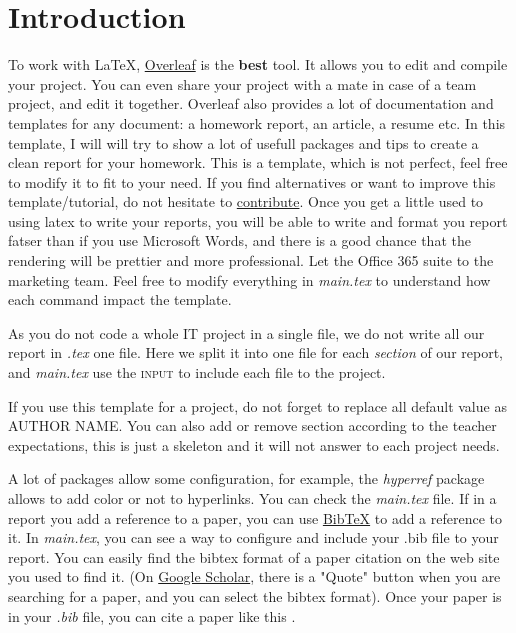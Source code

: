 \section{Introduction}\label{sec:intro}
To work with \LaTeX, \href{https://fr.overleaf.com/}{Overleaf} is the \textbf{best} tool. It allows you to edit and compile your project. You can even share your project with a mate in case of a team project, and edit it together. Overleaf also provides a lot of documentation and templates for any document: a homework report, an article, a resume etc.
In this template, I will will try to show  a lot of usefull packages and tips to create a clean report for your homework. This is a template, which is not perfect, feel free to modify it to fit to your need. If you find alternatives or want to improve this template/tutorial, do not hesitate to \href{https://github.com/ElouanV/ease-sciag}{contribute}. Once you get a little used to using latex to write your reports, you will be able to write and format you report fatser than if you use Microsoft Words, and there is a good chance that the rendering will be prettier and more professional. Let the Office 365 suite to the marketing team.
Feel free to modify everything in \textit{main.tex} to understand how each command impact the template.

As you do not code a whole IT project in a single file, we do not write all our report in \textit{.tex} one file. Here we split it into one file for each \textit{section} of our report, and \textit{main.tex} use the \textsc{input} to include each file to the project.

If you use this template for a project, do not forget to replace all default value as \textsc{AUTHOR NAME}. You can also add or remove section according to the teacher expectations, this is just a skeleton and it will not answer to each project needs.

A lot of packages allow some configuration, for example, the \textit{hyperref} package allows to add color or not to hyperlinks. You can check the \textit{main.tex} file.
If in  a report you add a reference to a paper, you can use \href{https://fr.overleaf.com/learn/latex/Bibliography_management_with_bibtex}{BibTeX} to add a reference to it. In \textit{main.tex}, you can see a way to configure and include your .bib file to your report. You can easily find the bibtex format of a paper citation on the web site you used to find it. (On \href{https://scholar.google.com/}{Google Scholar}, there is a "Quote" button when you are searching for a paper, and you can select the bibtex format). Once your paper is in your \textit{.bib} file, you can cite a paper like this \cite{zhang2022explaining}.